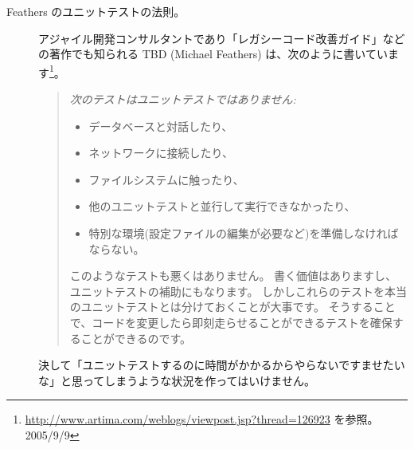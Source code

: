 \documentclass[a4paper,10pt,twoside]{book}
\begin{document}
\begin{description}


\item[Feathers のユニットテストの法則。]
  アジャイル開発コンサルタントであり「レガシーコード改善ガイド」などの著作でも知られる%
  TBD (Michael Feathers) は、次のように書いています\footnote{\url{http://www.artima.com/weblogs/viewpost.jsp?thread=126923} を参照。2005/9/9}。
  \begin{quotation}
  \noindent
  {\it
  次のテストはユニットテストではありません:
  \begin{itemize}
	\item データベースと対話したり、
	\item ネットワークに接続したり、
	\item ファイルシステムに触ったり、
	\item 他のユニットテストと並行して実行できなかったり、
	\item 特別な環境(設定ファイルの編集が必要など)を準備しなければならない。
 \end{itemize}
このようなテストも悪くはありません。
書く価値はありますし、ユニットテストの補助にもなります。
しかしこれらのテストを本当のユニットテストとは分けておくことが大事です。
そうすることで、コードを変更したら即刻走らせることができるテストを確保することができるのです。
 }
  \end{quotation}
決して「ユニットテストするのに時間がかかるからやらないですませたいな」と思ってしまうような状況を作ってはいけません。


\end{description}
\end{document}
